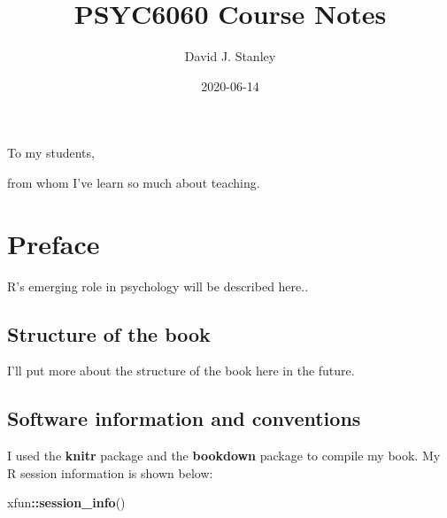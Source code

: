 \documentclass[
]{krantz}
\title{PSYC6060 Course Notes}
\author{David J. Stanley}
\date{2020-06-14}
\makeatletter
\newenvironment{Shaded}{\begin{snugshade}}{\end{snugshade}}
\newcommand{\KeywordTok}[1]{\textcolor[rgb]{0.27,0.27,0.27}{\textbf{#1}}}
\newcommand{\NormalTok}[1]{#1}
\newcommand{\OperatorTok}[1]{\textcolor[rgb]{0.43,0.43,0.43}{\textbf{#1}}}
\newenvironment{kframe}{%
\medskip{}
\setlength{\fboxsep}{.8em}
 \def\at@end@of@kframe{}%
 \ifinner\ifhmode%
  \def\at@end@of@kframe{\end{minipage}}%
  \begin{minipage}{\columnwidth}%
 \fi\fi%
 \def\FrameCommand##1{\hskip\@totalleftmargin \hskip-\fboxsep
 \colorbox{shadecolor}{##1}\hskip-\fboxsep
     \hskip-\linewidth \hskip-\@totalleftmargin \hskip\columnwidth}%
 \MakeFramed {\advance\hsize-\width
   \@totalleftmargin\z@ \linewidth\hsize
   \@setminipage}}%
 {\par\unskip\endMakeFramed%
 \at@end@of@kframe}
\renewenvironment{Shaded}{\begin{kframe}}{\end{kframe}}
\makeatother
\begin{document}
\maketitle


\thispagestyle{empty}

\begin{center}
To my students,

from whom I've learn so much about teaching.
\end{center}

\setlength{\abovedisplayskip}{-5pt}
\setlength{\abovedisplayshortskip}{-5pt}

{
\hypersetup{linkcolor=}
\setcounter{tocdepth}{2}
\tableofcontents
}
\listoftables
\listoffigures
\hypertarget{preface}{%
\chapter*{Preface}\label{preface}}


R's emerging role in psychology will be described here..

\hypertarget{structure-of-the-book}{%
\section*{Structure of the book}\label{structure-of-the-book}}


I'll put more about the structure of the book here in the future.

\hypertarget{software-information-and-conventions}{%
\section*{Software information and conventions}\label{software-information-and-conventions}}


I used the \textbf{knitr} package \citep{xie2015} and the \textbf{bookdown} package \citep{R-bookdown} to compile my book. My R session information is shown below:

\begin{Shaded}
\begin{Highlighting}[]
\NormalTok{xfun}\OperatorTok{::}\KeywordTok{session_info}\NormalTok{()}
\end{Highlighting}
\end{Shaded}
\end{document}
